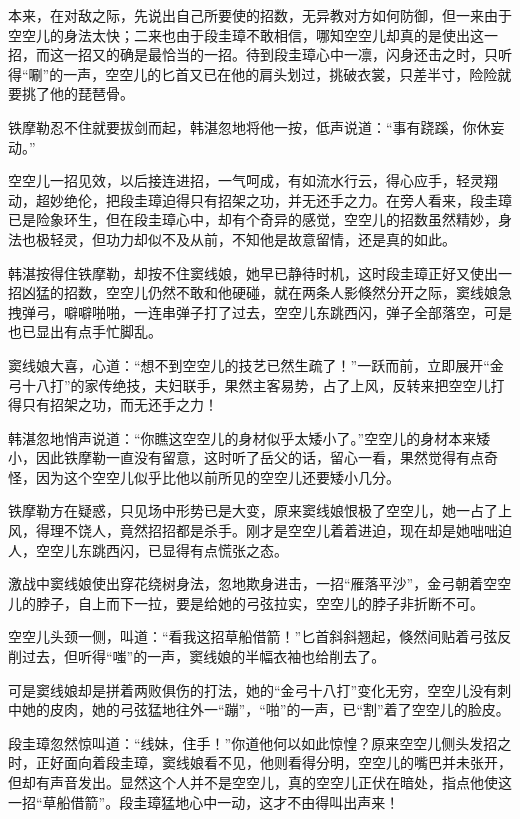\documentclass[12pt,oneside]{book}
\begin{document}
本来，在对敌之际，先说出自己所要使的招数，无异教对方如何防御，但一来由于空空儿的身法太快；二来也由于段圭璋不敢相信，哪知空空儿却真的是使出这一招，而这一招又的确是最恰当的一招。待到段圭璋心中一凛，闪身还击之时，只听得``唰''的一声，空空儿的匕首又已在他的肩头划过，挑破衣裳，只差半寸，险险就要挑了他的琵琶骨。

铁摩勒忍不住就要拔剑而起，韩湛忽地将他一按，低声说道：``事有跷蹊，你休妄动。''

空空儿一招见效，以后接连进招，一气呵成，有如流水行云，得心应手，轻灵翔动，超妙绝伦，把段圭璋迫得只有招架之功，并无还手之力。在旁人看来，段圭璋已是险象环生，但在段圭璋心中，却有个奇异的感觉，空空儿的招数虽然精妙，身法也极轻灵，但功力却似不及从前，不知他是故意留情，还是真的如此。

韩湛按得住铁摩勒，却按不住窦线娘，她早已静待时机，这时段圭璋正好又使出一招凶猛的招数，空空儿仍然不敢和他硬碰，就在两条人影倏然分开之际，窦线娘急拽弹弓，噼噼啪啪，一连串弹子打了过去，空空儿东跳西闪，弹子全部落空，可是也已显出有点手忙脚乱。

窦线娘大喜，心道：``想不到空空儿的技艺已然生疏了！''一跃而前，立即展开``金弓十八打''的家传绝技，夫妇联手，果然主客易势，占了上风，反转来把空空儿打得只有招架之功，而无还手之力！

韩湛忽地悄声说道：``你瞧这空空儿的身材似乎太矮小了。''空空儿的身材本来矮小，因此铁摩勒一直没有留意，这时听了岳父的话，留心一看，果然觉得有点奇怪，因为这个空空儿似乎比他以前所见的空空儿还要矮小几分。

铁摩勒方在疑惑，只见场中形势已是大变，原来窦线娘恨极了空空儿，她一占了上风，得理不饶人，竟然招招都是杀手。刚才是空空儿着着进迫，现在却是她咄咄迫人，空空儿东跳西闪，已显得有点慌张之态。

激战中窦线娘使出穿花绕树身法，忽地欺身进击，一招``雁落平沙''，金弓朝着空空儿的脖子，自上而下一拉，要是给她的弓弦拉实，空空儿的脖子非折断不可。

空空儿头颈一侧，叫道：``看我这招草船借箭！''匕首斜斜翘起，倏然间贴着弓弦反削过去，但听得``嗤''的一声，窦线娘的半幅衣袖也给削去了。

可是窦线娘却是拼着两败俱伤的打法，她的``金弓十八打''变化无穷，空空儿没有刺中她的皮肉，她的弓弦猛地往外一``蹦''，``啪''的一声，已``割''着了空空儿的脸皮。

段圭璋忽然惊叫道：``线妹，住手！''你道他何以如此惊惶？原来空空儿侧头发招之时，正好面向着段圭璋，窦线娘看不见，他则看得分明，空空儿的嘴巴并未张开，但却有声音发出。显然这个人并不是空空儿，真的空空儿正伏在暗处，指点他使这一招``草船借箭''。段圭璋猛地心中一动，这才不由得叫出声来！
\end{document}
